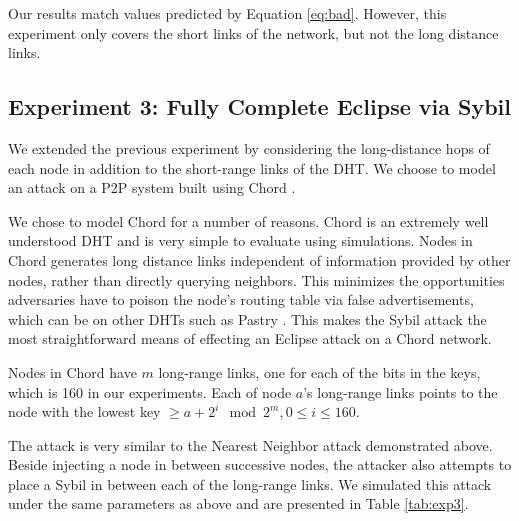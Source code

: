 \documentclass[11pt,conference]{IEEEtran}
\begin{document}
Our results match values predicted by Equation \ref{eq:bad}.
However, this experiment only covers the short links of the network, but not the long distance links.




\subsection{Experiment 3: Fully Complete Eclipse via Sybil}
\label{sec:chord}
We extended the previous experiment by considering the long-distance hops of each node in addition to the short-range links of the DHT.
We choose to model an attack on a P2P system built using Chord \cite{chord}.


We chose to model Chord for a number of reasons.
Chord is an extremely well understood DHT and is very simple to evaluate using simulations.
Nodes in Chord generates long distance links independent of information provided by other nodes, rather than directly querying neighbors.
This minimizes the opportunities adversaries have to poison the node's routing table via false advertisements, which can be on other DHTs such as Pastry \cite{pastry}. 
This makes the Sybil attack the most straightforward means of effecting an Eclipse attack on a Chord network.

Nodes in Chord have $m$ long-range links, one for each of the bits in the keys, which is 160 in our experiments.
Each of node $a$'s long-range links points to the node with the lowest key $\geq a + 2^{i} \mod 2^{m}, 0 \leq i \leq 160$.

The attack is very similar to the Nearest Neighbor attack demonstrated above.
Beside injecting a node in between successive nodes, the attacker also attempts to place a Sybil in between each of the long-range links.
We simulated this attack under the same parameters as above and are presented in Table \ref{tab:exp3}.
\end{document}
